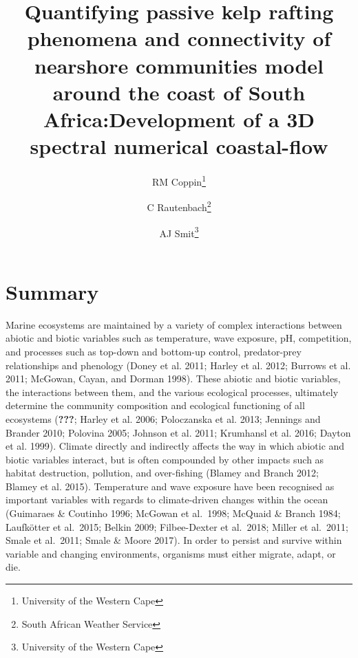 \documentclass[
]{article}
\title{Quantifying passive kelp rafting phenomena and connectivity of nearshore
communities model around the coast of South Africa:Development of a 3D
spectral numerical coastal-flow}
\author{RM Coppin\footnote{University of the Western Cape} \and C Rautenbach\footnote{South African Weather Service} \and AJ Smit\footnote{University of the Western Cape}}
\date{}
\begin{document}
\maketitle

{
\setcounter{tocdepth}{2}
\tableofcontents
}
\hypertarget{summary}{%
\section{Summary}\label{summary}}

Marine ecosystems are maintained by a variety of complex interactions
between abiotic and biotic variables such as temperature, wave exposure,
pH, competition, and processes such as top-down and bottom-up control,
predator-prey relationships and phenology (Doney et al. 2011; Harley et
al. 2012; Burrows et al. 2011; McGowan, Cayan, and Dorman 1998). These
abiotic and biotic variables, the interactions between them, and the
various ecological processes, ultimately determine the community
composition and ecological functioning of all ecosystems
({\textbf{???}}; Harley et al. 2006; Poloczanska et al. 2013; Jennings
and Brander 2010; Polovina 2005; Johnson et al. 2011; Krumhansl et al.
2016; Dayton et al. 1999). Climate directly and indirectly affects the
way in which abiotic and biotic variables interact, but is often
compounded by other impacts such as habitat destruction, pollution, and
over-fishing (Blamey and Branch 2012; Blamey et al. 2015). Temperature
and wave exposure have been recognised as important variables with
regards to climate-driven changes within the ocean (Guimaraes \&
Coutinho 1996; McGowan et al.~1998; McQuaid \& Branch 1984; Laufkötter
et al.~2015; Belkin 2009; Filbee-Dexter et al.~2018; Miller et al.~2011;
Smale et al.~2011; Smale \& Moore 2017). In order to persist and survive
within variable and changing environments, organisms must either
migrate, adapt, or die.
\end{document}
